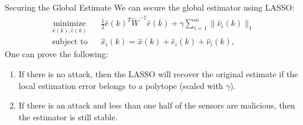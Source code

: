 \documentclass[10pt]{beamer}
\begin{document}
\begin{frame}{Securing the Global Estimate}
We can secure the global estimator using LASSO:
\begin{align*}
  &\mathop{\textrm{minimize}}\limits_{\hat x(k),\hat e(k)}&
  & \frac{1}{2}\hat e(k)^T \tilde W^{-1} \hat e(k) + \gamma \sum_{i=1}^m \|\hat \nu_i(k)\|_1\\
  &\textrm{subject to} &
  &\hat x_i(k)  =  \hat x(k) + \hat e_i(k)+\hat \nu_i(k),&
\end{align*}
One can prove the following:
\begin{enumerate}
\item If there is no attack, then the LASSO will recover the original estimate if the local estimation error belongs to a polytope (scaled with $\gamma$).
\item If there is an attack and less than one half of the sensors are malicious, then the estimator is still stable.
\end{enumerate}
\end{frame}
% 
\end{document}
